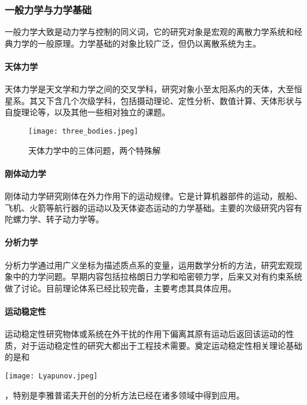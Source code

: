 \subsubsection{一般力学与力学基础}

一般力学大致是动力学与控制的同义词，它的研究对象是宏观的离散力学系统和经典力学的一般原理。力学基础的对象比较广泛，但仍以离散系统为主。

\paragraph{天体力学}

天体力学是天文学和力学之间的交叉学科，研究对象小至太阳系内的天体，大至恒星系。其又下含几个次级学科，包括摄动理论、定性分析、数值计算、天体形状与自旋理论等，以及其他一些相对独立的课题。

\begin{figure}[ht]
    \centering
    \texttt{[image: three\_bodies.jpeg]}
    \caption{天体力学中的三体问题，两个特殊解}
\end{figure}

\paragraph{刚体动力学}

刚体动力学研究刚体在外力作用下的运动规律。它是计算机器部件的运动，舰船、飞机、火箭等航行器的运动以及天体姿态运动的力学基础。主要的次级研究内容有陀螺力学、转子动力学等。


\paragraph{分析力学}

分析力学通过用广义坐标为描述质点系的变量，运用数学分析的方法，研究宏观现
象中的力学问题。早期内容包括拉格朗日力学和哈密顿力学，后来又对有约束系统做了讨论。目前理论体系已经比较完备，主要考虑其具体应用。

\paragraph{运动稳定性}

运动稳定性研究物体或系统在外干扰的作用下偏离其原有运动后返回该运动的性质，对于运动稳定性的研究大都出于工程技术需要。奠定运动稳定性相关理论基础的是和%
\begin{marginparfigure}
    \texttt{[image: Lyapunov.jpeg]}
\end{marginparfigure}%
，特别是李雅普诺夫开创的分析方法已经在诸多领域中得到应用。

